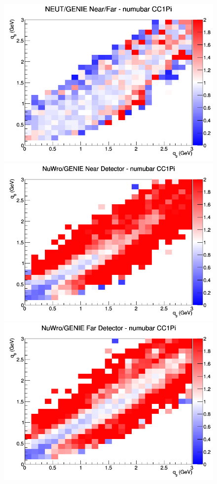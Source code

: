 \documentclass[12pt]{article}
\begin{document}
\begin{figure}[h]
\endminipage
{}
\includegraphics[width=\linewidth]{eff_q0_q3/GAr/ratios/CC1Pi_NEUT_GENIE_numubar_NF_q3_q0.png}
\endminipage
\newline
{}
\includegraphics[width=\linewidth]{eff_q0_q3/GAr/ratios/CC1Pi_NuWro_GENIE_numubar_near_q3_q0.png}
\endminipage
{}
\includegraphics[width=\linewidth]{eff_q0_q3/GAr/ratios/CC1Pi_NuWro_GENIE_numubar_far_q3_q0.png}

\end{figure}
\end{document}
